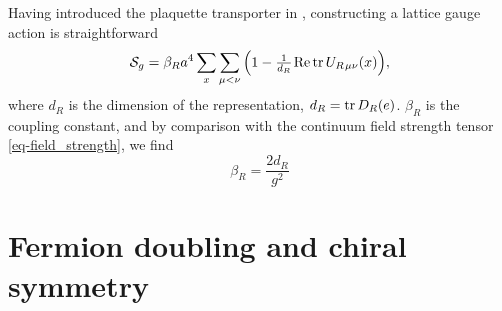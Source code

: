 Having introduced the plaquette transporter in ,
constructing a lattice gauge action is straightforward
%
\begin{equation}
  \mathcal{S}_g = \beta_R a^4 \sum_x \sum_{\mu < \nu} \Big( 1 -
    \textstyle\frac{1}{d_R} \hskip.2ex \text{Re} \operatorname{tr} U_{R \hskip.2ex\mu\nu}(x) \Big),
\end{equation}
%
where $d_R$ is the dimension of the representation, $d_R = \operatorname{tr} D_R(e)$. $\beta_R$ is the
coupling constant, and by comparison with the continuum field strength tensor
\eqref{eq-field_strength}, we find
%
\begin{equation}
  \beta_R = \frac{2 d_R}{g^2}
\end{equation}

\section{Fermion doubling and chiral symmetry} \label{sec-fermion_doubling}

